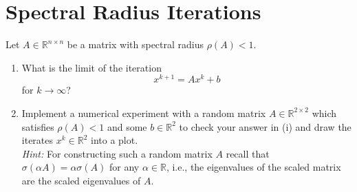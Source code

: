 \section{Spectral Radius Iterations}
Let $A \in \mathbb{R}^{n \times n}$ be a matrix with spectral radius $\rho(A) < 1$.
	\begin{enumerate}
		\item What is the limit of the iteration
		$$
			x^{k+1} = A x^k +b
		$$
		for $k \rightarrow \infty$?
		
		\item Implement a numerical experiment with a random matrix $A \in \mathbb{R}^{2 \times 2}$ which satisfies $\rho(A)<1$ and some $b\in \mathbb{R}^2$ to check your answer in (i) and draw the iterates $x^k \in \mathbb{R}^2$ into a plot.\\[0.1cm]
				\textit{Hint:} For constructing such a random matrix $A$ recall that $\sigma(\alpha A) = \alpha \sigma(A)$ for any $\alpha \in \mathbb{R}$, i.e., the eigenvalues of the scaled matrix are the scaled eigenvalues of $A$.
	\end{enumerate}